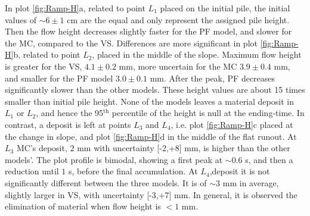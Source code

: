 \documentclass{article}
\begin{document}
In plot \ref{fig:Ramp-H}a, related to point $L_1$ placed on the initial pile, the initial values of $\sim 6\pm 1$ cm are the equal and only represent the assigned pile height. Then the flow height decreases slightly faster for the PF model, and slower for the MC, compared to the VS. Differences are more significant in plot \ref{fig:Ramp-H}b, related to point $L_2$, placed in the middle of the slope. Maximum flow height is greater for the VS, $4.1\pm 0.2$ mm, more uncertain for the MC $3.9\pm 0.4$ mm, and smaller for the PF model $3.0\pm 0.1$ mm. After the peak, PF decreases significantly slower than the other models. These height values are about 15 times smaller than initial pile height. None of the models leaves a material deposit in $L_1$ or $L_2$, and hence the 95$^{\mathrm{th}}$ percentile of the height is null at the ending-time. In contrast, a deposit is left at points $L_3$ and $L_4$, i.e. plot \ref{fig:Ramp-H}c placed at the change in slope, and plot \ref{fig:Ramp-H}d in the middle of the flat runout. At $L_3$ MC's deposit, $2$ mm with uncertainty [-2,+8] mm, is higher than the other models'. The plot profile is bimodal, showing a first peak at $\sim 0.6$ s, and then a reduction until $1$ s, before the final accumulation. At $L_4$,deposit it is not significantly different between the three models. It is of $\sim 3$ mm in average, slightly larger in VS, with uncertainty [-3,+7] mm. In general, it is observed the elimination of material when flow height is $<1$ mm.
\end{document}
